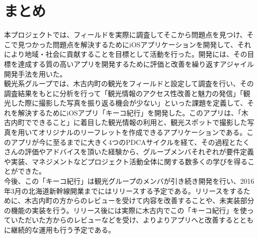 \section{まとめ}
本プロジェクトでは、フィールドを実際に調査してそこから問題点を見つけ、そこで見つかった問題点を解決するためにiOSアプリケーションを開発して、それにより地域・社会に貢献することを目標として活動を行った。開発には、その目標を達成する質の高いアプリを開発するために評価と改善を繰り返すアジャイル開発手法を用いた。\\
観光系グループでは、木古内町の観光をフィールドと設定して調査を行い、その調査結果をもとに分析を行って「観光情報のアクセス性改善と魅力の発信」「観光した際に撮影した写真を振り返る機会が少ない」といった課題を定義して、それを解決するためにiOSアプリ「キーコ紀行」を開発した。このアプリは、「木古内町でできること」に着目した観光情報の利用と、観光スポットで撮影した写真を用いてオリジナルのリーフレットを作成できるアプリケーションである。このアプリが今に至るまでに大きく4つのPDCAサイクルを経て、その過程とたくさんの評価やアドバイスを頂いた経験から、グループメンバそれぞれが要件定義や実装、マネジメントなどプロジェクト活動全体に関する数多くの学びを得ることができた。\\
今後、この「キーコ紀行」は観光グループのメンバが引き続き開発を行い、2016年3月の北海道新幹線開業までにはリリースする予定である。リリースをするために、木古内町の方からのレビューを受けて内容を改善することや、未実装部分の機能の実装を行う。リリース後には実際に木古内でこの「キーコ紀行」を使っていただいた方からのレビューなどを受け、よりよりアプリへと改善するとともに継続的な運用も行う予定である。

